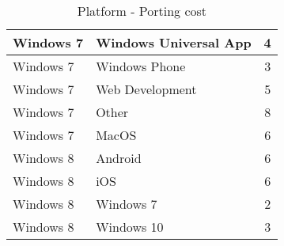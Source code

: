 \begin{table}[h]
\begin{tabular}{|l|l|c|}
		Windows 7  			& Windows Universal App 				& 4     		\\ \hline
		Windows 7  			& Windows Phone 				& 3     		\\ \hline
		Windows 7  			& Web Development 				& 5     		\\ \hline
		Windows 7  			& Other 				& 8     		\\ \hline
		Windows 7  			& MacOS 				& 6     		\\ \hline
		Windows 8  			& Android 				& 6     		\\ \hline
		Windows 8  			& iOS 				& 6     		\\ \hline
		Windows 8  			& Windows 7 				& 2     		\\ \hline
		Windows 8  			& Windows 10 				& 3     		\\ \hline
	
	\end{tabular} 
	\caption{Platform - Porting cost} 
	\label{platformportingcosts} 
\end{table}\newpage
